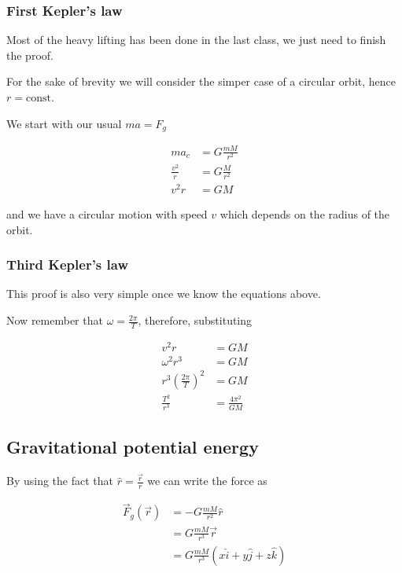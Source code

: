 \documentclass[10pt]{extarticle}
\begin{document}
\subsubsection{First Kepler's law}

Most of the heavy lifting has been done in the last class, we just need to finish the proof.

For the sake of brevity we will consider the simper case of a circular orbit, hence $r = \text{const}$.

We start with our usual $ma = F_g$

\begin{align*}
    m a_c         & = G \frac{m M}{r^2} \\
    \frac{v^2}{r} & = G \frac{M}{r^2}   \\
    v^2 r         & = G M
\end{align*}

and we have a circular motion with speed $v$ which depends on the radius of the orbit.

\subsubsection{Third Kepler's law}

This proof is also very simple once we know the equations above.

Now remember that $\omega = \frac{2 \pi}{T}$, therefore, substituting

\begin{align*}
    v^2 r                              & = G M                 \\
    \omega^2 r^3                       & = G M                 \\
    r^3 \left(\frac{2 \pi}{T}\right)^2 & = G M                 \\
    \frac{T^2}{r^3}                    & = \frac{4 \pi^2}{G M}
\end{align*}

\subsection{Gravitational potential energy}

By using the fact that $\hat r = \frac{\vec r}{r}$ we can write the force as

\begin{align*}
    \vec F_g (\vec r) & = - G \frac{m M}{r^2} \hat r                         \\
                      & = G \frac{m M}{r^3} \vec r                           \\
                      & = G \frac{m M}{r^3} (x \hat i + y \hat j + z \hat k) \\
\end{align*}
\end{document}
